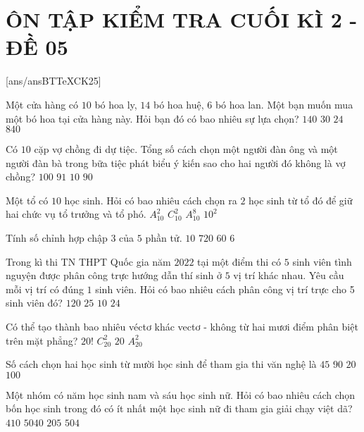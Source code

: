 \section*{ÔN TẬP KIỂM TRA CUỐI KÌ 2 - ĐỀ 05}
\setcounter{ex}{0}\setcounter{bt}{0}
[ans/ansBTTeXCK25]
\begin{ex}
Một cửa hàng có $10$ bó hoa ly, $14$ bó hoa huệ, $6$ bó hoa lan. Một bạn muốn mua một bó hoa tại cửa hàng này. Hỏi bạn đó có bao nhiêu sự lựa chọn?
\choice
{$140$}
{$30$}
{$24$}
{$840$}
\end{ex}
\begin{ex}
Có $10$ cặp vợ chồng đi dự tiệc. Tổng số cách chọn một người đàn ông và một người đàn bà trong bữa tiệc phát biểu ý kiến sao cho hai người đó không là vợ chồng?
\choice
{$100$}
{$91$}
{$10$}
{$90$}
\end{ex}
\begin{ex}
Một tổ có $10$ học sinh. Hỏi có bao nhiêu cách chọn ra $2$ học sinh từ tổ đó để giữ hai chức vụ tổ trưởng và tổ phó.
\choice
{$A_{10}^2$}
{$C_{10}^2$}
{$A_{10}^8$}
{$10^2$}
\end{ex}
\begin{ex}
Tính số chỉnh hợp chập $3$ của $5$ phần tử.
\choice
{$10$}
{$720$}
{$60$}
{$6$}
\end{ex}
\begin{ex}
Trong kì thi TN THPT Quốc gia năm $2022$ tại một điểm thi có $5$ sinh viên tình nguyện được phân công trực hướng dẫn thí sinh ở $5$ vị trí khác nhau. Yêu cầu mỗi vị trí có đúng $1$ sinh viên. Hỏi có bao nhiêu cách phân công vị trí trực cho 5 sinh viên đó?
\choice
{$120$}
{$25$}
{$10$}
{$24$}
\end{ex}
\begin{ex}
Có thể tạo thành bao nhiêu véctơ khác vectơ - không từ hai mươi điểm phân biệt trên mặt phẳng?
\choice
{$20!$}
{$C_{20}^2$}
{$20$}
{$A_{20}^2$}
\end{ex}
\begin{ex}
Số cách chọn hai học sinh từ mười học sinh để tham gia thi văn nghệ là
\choice
{$45$}
{$90$}
{$20$}
{$100$}
\end{ex}
\begin{ex}
Một nhóm có năm học sinh nam và sáu học sinh nữ. Hỏi có bao nhiêu cách chọn bốn học sinh trong đó có ít nhất một học sinh nữ đi tham gia giải chạy việt dã?
\choice
{$410$}
{$5040$}
{$205$}
{$504$}
\end{ex}

